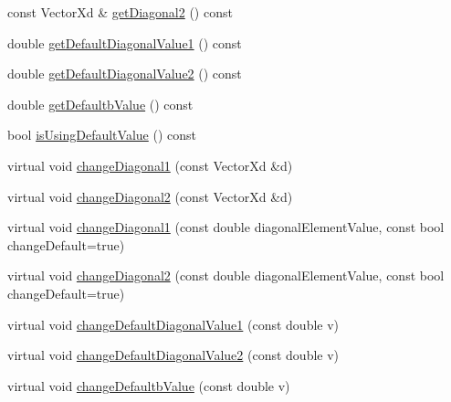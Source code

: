 \begin{DoxyCompactItemize}
\item 
const Vector\+Xd \& \hyperlink{classocra_1_1DoubleDiagonalLinearFunction_a764b18fae37fa4dd6ecff2240c583a90}{get\+Diagonal2} () const
\item 
double \hyperlink{classocra_1_1DoubleDiagonalLinearFunction_a9093eef2a34b3c96b9510794b91279cc}{get\+Default\+Diagonal\+Value1} () const
\item 
double \hyperlink{classocra_1_1DoubleDiagonalLinearFunction_a3593bb0fc409844b8d30e4785565c389}{get\+Default\+Diagonal\+Value2} () const
\item 
double \hyperlink{classocra_1_1DoubleDiagonalLinearFunction_a51c22f2f4a7ae45bf61d5ee36345acb4}{get\+Defaultb\+Value} () const
\item 
bool \hyperlink{classocra_1_1DoubleDiagonalLinearFunction_a8a20ef8ec7347cdd86b630c33eed3e9e}{is\+Using\+Default\+Value} () const
\item 
virtual void \hyperlink{classocra_1_1DoubleDiagonalLinearFunction_aa49e6964582aa9da6c02bacb68937e4d}{change\+Diagonal1} (const Vector\+Xd \&d)
\item 
virtual void \hyperlink{classocra_1_1DoubleDiagonalLinearFunction_aa6ec35d1e7abf6300e7ba37e42c3b467}{change\+Diagonal2} (const Vector\+Xd \&d)
\item 
virtual void \hyperlink{classocra_1_1DoubleDiagonalLinearFunction_ace71385fd62acf0749cbcf96a0477868}{change\+Diagonal1} (const double diagonal\+Element\+Value, const bool change\+Default=true)
\item 
virtual void \hyperlink{classocra_1_1DoubleDiagonalLinearFunction_a1a9ec0f7bb11ae2f1ddd6dffceea8921}{change\+Diagonal2} (const double diagonal\+Element\+Value, const bool change\+Default=true)
\item 
virtual void \hyperlink{classocra_1_1DoubleDiagonalLinearFunction_a982adc5313b550ac6fa3b420051a9505}{change\+Default\+Diagonal\+Value1} (const double v)
\item 
virtual void \hyperlink{classocra_1_1DoubleDiagonalLinearFunction_a1380c4f6f99af312d2eae2b0355be4cc}{change\+Default\+Diagonal\+Value2} (const double v)
\item 
virtual void \hyperlink{classocra_1_1DoubleDiagonalLinearFunction_a8af650affad3759e7a069d0cabcd4c2e}{change\+Defaultb\+Value} (const double v)
\end{DoxyCompactItemize}
